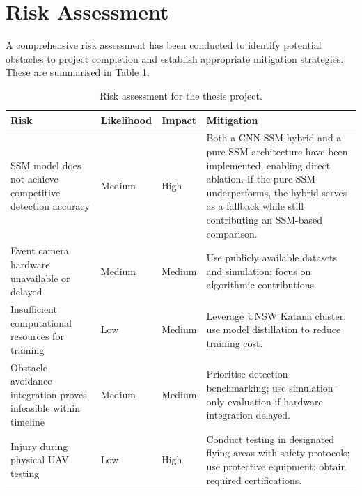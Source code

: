 \documentclass[11pt, a4paper]{report}
\begin{document}
\newpage

\section{Risk Assessment}
A comprehensive risk assessment has been conducted to identify potential obstacles to project completion and establish appropriate mitigation strategies. These are summarised in Table \ref{tab:risk_assessment}.

\begin{table}[h!]
    \centering
    \small %
    \caption{Risk assessment for the thesis project.}
    \label{tab:risk_assessment}
    \renewcommand{\arraystretch}{1.5}
    \begin{tabularx}{\textwidth}{|>{\RaggedRight\arraybackslash}p{3cm}|l|l|>{\RaggedRight\arraybackslash}X|}
        \hline
        \rowcolor[gray]{0.9} \textbf{Risk} & \textbf{Likelihood} & \textbf{Impact} & \textbf{Mitigation} \\ \hline
        SSM model does not achieve competitive detection accuracy & Medium & High & Both a CNN-SSM hybrid and a pure SSM architecture have been implemented, enabling direct ablation. If the pure SSM underperforms, the hybrid serves as a fallback while still contributing an SSM-based comparison. \\ \hline
        Event camera hardware unavailable or delayed & Medium & Medium & Use publicly available datasets and simulation; focus on algorithmic contributions. \\ \hline
        Insufficient computational resources for training & Low & Medium & Leverage UNSW Katana cluster; use model distillation to reduce training cost. \\ \hline
        Obstacle avoidance integration proves infeasible within timeline & Medium & Medium & Prioritise detection benchmarking; use simulation-only evaluation if hardware integration delayed. \\ \hline
        Injury during physical UAV testing & Low & High & Conduct testing in designated flying areas with safety protocols; use protective equipment; obtain required certifications. \\ \hline
    \end{tabularx}
\end{table}

\end{document}
